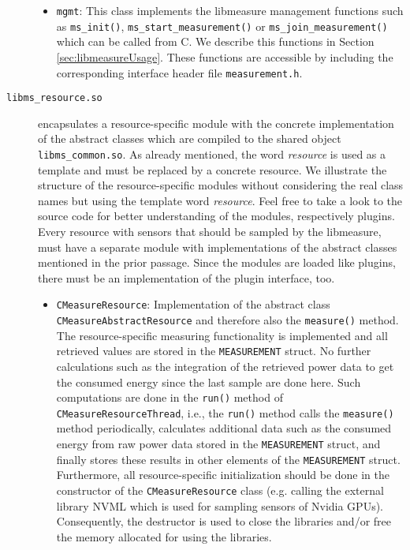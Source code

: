 \begin{description}
\begin{itemize}
		\item \texttt{mgmt}: This class implements the libmeasure management functions such as \texttt{ms\_init()}, \texttt{ms\_start\_measurement()} or \texttt{ms\_join\_measurement()} which can be called from C. We describe this functions in Section \ref{sec:libmeasureUsage}. These functions are accessible by including the corresponding interface header file \texttt{measurement.h}.
	\end{itemize}
	
	\item[\texttt{libms\_resource.so}] encapsulates a resource-specific module with the concrete implementation of the abstract classes which are compiled to the shared object \texttt{libms\_common.so}. As already mentioned, the word \textit{resource} is used as a template and must be replaced by a concrete resource. We  illustrate the structure of the resource-specific modules without considering the real class names but using the template word \textit{resource}. Feel free to take a look to the source code for better understanding of the modules, respectively plugins.\\
	Every resource with sensors that should be sampled by the libmeasure, must have a separate module with implementations of the abstract classes mentioned in the prior passage. Since the modules are loaded like plugins, there must be an implementation of the plugin interface, too.
	\begin{itemize}
		\item \texttt{CMeasureResource}: Implementation of the abstract class\\\texttt{CMeasureAbstractResource} and therefore also the \texttt{measure()} method. The resource-specific measuring functionality is implemented and all retrieved values are stored in the \texttt{MEASUREMENT} struct. No further calculations such as the integration of the retrieved power data to get the consumed energy since the last sample are done here. Such computations are done in the \texttt{run()} method of \texttt{CMeasureResourceThread}, i.e., the \texttt{run()} method calls the \texttt{measure()} method periodically, calculates additional data such as the consumed energy from raw power data stored in the \texttt{MEASUREMENT} struct, and finally stores these results in other elements of the \texttt{MEASUREMENT} struct. Furthermore, all resource-specific initialization should be done in the constructor of the \texttt{CMeasureResource} class (e.g. calling the external library NVML which is used for sampling sensors of Nvidia GPUs). Consequently, the destructor is used to close the libraries and/or free the memory allocated for using the libraries. 
		

\end{itemize}
\end{description}
